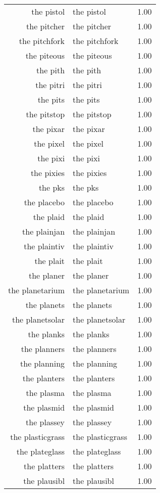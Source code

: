 \begin{table}[ht]
\begin{tabular}{rlr}
  the pistol & the pistol & 1.00 \\ 
  the pitcher & the pitcher & 1.00 \\ 
  the pitchfork & the pitchfork & 1.00 \\ 
  the piteous & the piteous & 1.00 \\ 
  the pith & the pith & 1.00 \\ 
  the pitri & the pitri & 1.00 \\ 
  the pits & the pits & 1.00 \\ 
  the pitstop & the pitstop & 1.00 \\ 
  the pixar & the pixar & 1.00 \\ 
  the pixel & the pixel & 1.00 \\ 
  the pixi & the pixi & 1.00 \\ 
  the pixies & the pixies & 1.00 \\ 
  the pks & the pks & 1.00 \\ 
  the placebo & the placebo & 1.00 \\ 
  the plaid & the plaid & 1.00 \\ 
  the plainjan & the plainjan & 1.00 \\ 
  the plaintiv & the plaintiv & 1.00 \\ 
  the plait & the plait & 1.00 \\ 
  the planer & the planer & 1.00 \\ 
  the planetarium & the planetarium & 1.00 \\ 
  the planets & the planets & 1.00 \\ 
  the planetsolar & the planetsolar & 1.00 \\ 
  the planks & the planks & 1.00 \\ 
  the planners & the planners & 1.00 \\ 
  the planning & the planning & 1.00 \\ 
  the planters & the planters & 1.00 \\ 
  the plasma & the plasma & 1.00 \\ 
  the plasmid & the plasmid & 1.00 \\ 
  the plassey & the plassey & 1.00 \\ 
  the plasticgrass & the plasticgrass & 1.00 \\ 
  the plateglass & the plateglass & 1.00 \\ 
  the platters & the platters & 1.00 \\ 
  the plausibl & the plausibl & 1.00 \\ 

\end{tabular}
\end{table}
